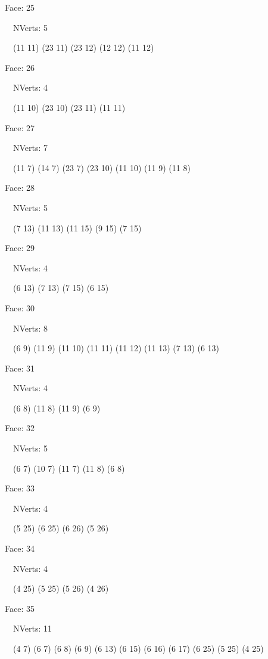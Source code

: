 \documentclass{article}
\begin{document}
{\footnotesize 

Face: 25

\   \    NVerts: 5

 \   \   (11 11) (23 11) (23 12) (12 12) (11 12)}

{\footnotesize 

Face: 26

\   \    NVerts: 4

 \   \   (11 10) (23 10) (23 11) (11 11)}

{\footnotesize 

Face: 27

\   \    NVerts: 7

 \   \   (11 7) (14 7) (23 7) (23 10) (11 10) (11 9) (11 8)}

{\footnotesize 

Face: 28

\   \    NVerts: 5

 \   \   (7 13) (11 13) (11 15) (9 15) (7 15)}

{\footnotesize 

Face: 29

\   \    NVerts: 4

 \   \   (6 13) (7 13) (7 15) (6 15)}

{\footnotesize 

Face: 30

\   \    NVerts: 8

 \   \   (6 9) (11 9) (11 10) (11 11) (11 12) (11 13) (7 13) (6 13)}

{\footnotesize 

Face: 31

\   \    NVerts: 4

 \   \   (6 8) (11 8) (11 9) (6 9)}

{\footnotesize 

Face: 32

\   \    NVerts: 5

 \   \   (6 7) (10 7) (11 7) (11 8) (6 8)}

{\footnotesize 

Face: 33

\   \    NVerts: 4

 \   \   (5 25) (6 25) (6 26) (5 26)}

{\footnotesize 

Face: 34

\   \    NVerts: 4

 \   \   (4 25) (5 25) (5 26) (4 26)}

{\footnotesize 

Face: 35

\   \    NVerts: 11

 \   \   (4 7) (6 7) (6 8) (6 9) (6 13) (6 15) (6 16) (6 17) (6 25) (5 25) (4 25)}
\end{document}
